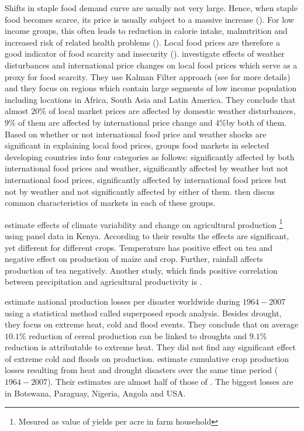 \documentclass[a4paper,12pt]{article}
\begin{document}
Shifts in staple food demand curve are usually not very large. Hence, when staple food becomes scarce, its price is usually subject to a massive increase (\citealp{Brown2015, brown2014book}). For low income groups, this often leads to reduction in calorie intake, malnutrition and increased risk of related health problems (\citealp{Golden2011, Handa2006}). Local food prices are therefore a good indicator of food scarcity and insecurity (\citealp{baffes2017, Brown2015}). \cite{Brown2015} investigate effects of weather disturbances and international price changes on local food prices which serve as a proxy for food scarcity. They use Kalman Filter approach (see \cite{KoopmanSJ} for more details) and they focus on regions which contain large segments of low income population including locations in Africa, South Asia and Latin America. They conclude that almost $20\%$ of local market prices are affected by domestic weather disturbances, $9\%$ of them are affected by international price change and $4\%$by both of them. Based on whether or not international food price and weather shocks are significant in explaining local food prices, \cite{brown2014book} groups food markets in selected developing countries into four categories as follows: significantly affected by both international food prices and weather, significantly affected by weather but not international food prices, significantly affected by international food prices but not by weather and not significantly affected by either of them. \cite{brown2014book} then discus common characteristics of markets in each of these groups.

\cite{Ochieng2016} estimate effects of climate variability and change on agricultural production \footnote{Mesured as value of yields per acre in farm household} using panel data in Kenya. According to their results the effects are significant, yet different for different crops. Temperature has positive effect on tea and negative effect on production of maize and crop. Further, rainfall affects production of tea negatively. Another study, which finds positive correlation between precipitation and agricultural productivity is \cite{Vrieling2011}.







\cite{Pedram2016} estimate national production losses per disaster worldwide during ${1964-2007}$ using a statistical method called superposed epoch analysis. Besides drought, they focus on extreme heat, cold and flood events. They conclude that on average $10.1\%$ reduction of cereal production can be linked to droughts and $9.1\%$ reduction is attributable to extreme heat. They did not find any significant effect of extreme cold and floods on production. \cite{Mehrabi2017} estimate cumulative crop production losses resulting from heat and drought disasters over the same time period (${1964-2007}$). Their estimates are almost half of those of \cite{Pedram2016}. The biggest losses are in Botswana, Paraguay, Nigeria, Angola and USA.
\end{document}
